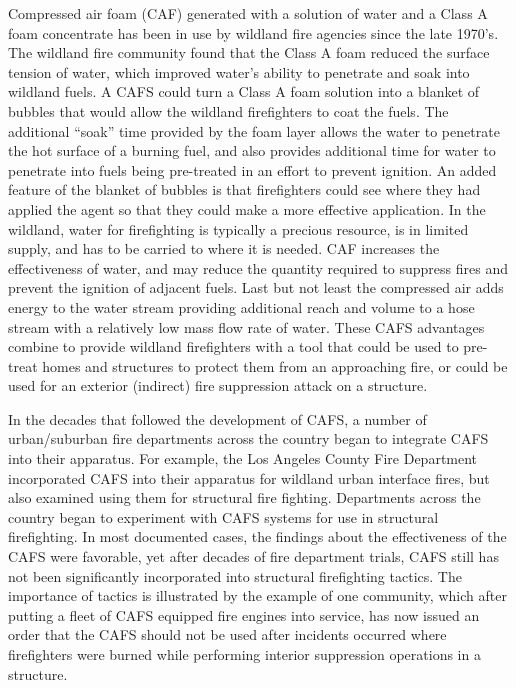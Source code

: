 \documentclass[12pt,oneside]{book}
\begin{document}
Compressed air foam (CAF) generated with a solution of water and a Class A foam concentrate has been in use by wildland fire agencies since the late 1970’s. The wildland fire community found that the Class A foam reduced the surface tension of water, which improved water's ability to penetrate and soak into wildland fuels. A CAFS could turn a Class A foam solution into a blanket of bubbles that would allow the wildland firefighters to coat the fuels. The additional ``soak'' time provided by the foam layer allows the water to penetrate the hot surface of a burning fuel, and also provides additional time for water to penetrate into fuels being pre-treated in an effort to prevent ignition. An added feature of the blanket of bubbles is that firefighters could see where they had applied the agent so that they could make a more effective application. In the wildland, water for firefighting is typically a precious resource, is in limited supply, and has to be carried to where it is needed. CAF increases the effectiveness of water, and may reduce the quantity required to suppress fires and prevent the ignition of adjacent fuels. Last but not least the compressed air adds energy to the water stream providing additional reach and volume to a hose stream with a relatively low mass flow rate of water. These CAFS advantages combine to provide wildland firefighters with a tool that could be used to pre-treat homes and structures to protect them from an approaching fire, or could be used for an exterior (indirect) fire suppression attack on a structure.

In the decades that followed the development of CAFS, a number of urban/suburban fire departments across the country began to integrate CAFS into their apparatus. For example, the Los Angeles County Fire Department incorporated CAFS into their apparatus for wildland urban interface fires, but also examined using them for structural fire fighting. Departments across the country began to experiment with CAFS systems for use in structural firefighting. In most documented cases, the findings about the effectiveness of the CAFS were favorable, yet after decades of fire department trials, CAFS still has not been significantly incorporated into structural firefighting tactics. The importance of tactics is illustrated by the example of one community, which after putting a fleet of CAFS equipped fire engines into service, has now issued an order that the CAFS should not be used after incidents occurred where firefighters were burned while performing interior suppression operations in a structure.
\end{document}
